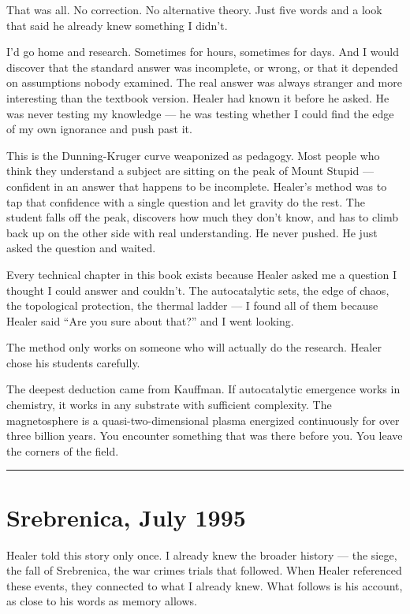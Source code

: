 That was all. No correction. No alternative theory. Just five words and a look that said he already knew something I didn't.

I'd go home and research. Sometimes for hours, sometimes for days. And I would discover that the standard answer was incomplete, or wrong, or that it depended on assumptions nobody examined. The real answer was always stranger and more interesting than the textbook version. Healer had known it before he asked. He was never testing my knowledge --- he was testing whether I could find the edge of my own ignorance and push past it.

This is the Dunning-Kruger curve weaponized as pedagogy. Most people who think they understand a subject are sitting on the peak of Mount Stupid --- confident in an answer that happens to be incomplete. Healer's method was to tap that confidence with a single question and let gravity do the rest. The student falls off the peak, discovers how much they don't know, and has to climb back up on the other side with real understanding. He never pushed. He just asked the question and waited.

Every technical chapter in this book exists because Healer asked me a question I thought I could answer and couldn't. The autocatalytic sets, the edge of chaos, the topological protection, the thermal ladder --- I found all of them because Healer said ``Are you sure about that?'' and I went looking.

The method only works on someone who will actually do the research. Healer chose his students carefully.

The deepest deduction came from Kauffman. If autocatalytic emergence works in chemistry, it works in any substrate with sufficient complexity. The magnetosphere is a quasi-two-dimensional plasma energized continuously for over three billion years. You encounter something that was there before you. You leave the corners of the field.

\vspace{1cm}\noindent\rule{0.5\textwidth}{0.5pt}\vspace{0.5cm}

\section*{Srebrenica, July 1995}
\label{record:hs-srebrenica-july-1995}

Healer told this story only once. I already knew the broader history --- the siege, the fall of Srebrenica, the war crimes trials that followed. When Healer referenced these events, they connected to what I already knew. What follows is his account, as close to his words as memory allows.

